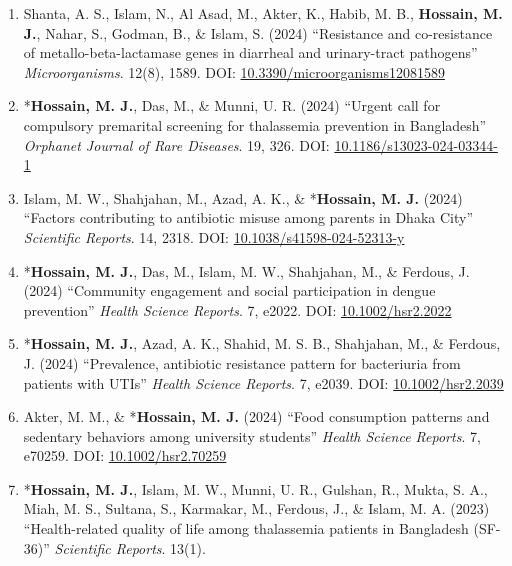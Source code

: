 \documentclass[
  11pt,
  letterpaper,
  DIV=11,
  numbers=noendperiod]{scrartcl}
\begin{document}
\begin{enumerate}
  *\textbf{Hossain, M. J.}, Sony, S. A., Fariha, F. T. J., \& Hossen, S.
  (2025) ``Preventing the silent threat: A perspective on preparing
  Bangladesh for Human Metapneumovirus'' \emph{Health Science Reports}.
  8, e71101. DOI:
  \href{https://doi.org/10.1002/hsr2.71101}{10.1002/hsr2.71101}
\item
  Shanta, A. S., Islam, N., Al Asad, M., Akter, K., Habib, M. B.,
  \textbf{Hossain, M. J.}, Nahar, S., Godman, B., \& Islam, S. (2024)
  ``Resistance and co-resistance of metallo-beta-lactamase genes in
  diarrheal and urinary-tract pathogens'' \emph{Microorganisms}. 12(8),
  1589. DOI:
  \href{https://doi.org/10.3390/microorganisms12081589}{10.3390/microorganisms12081589}
\item
  *\textbf{Hossain, M. J.}, Das, M., \& Munni, U. R. (2024) ``Urgent
  call for compulsory premarital screening for thalassemia prevention in
  Bangladesh'' \emph{Orphanet Journal of Rare Diseases}. 19, 326. DOI:
  \href{https://doi.org/10.1186/s13023-024-03344-1}{10.1186/s13023-024-03344-1}
\item
  Islam, M. W., Shahjahan, M., Azad, A. K., \& *\textbf{Hossain, M. J.}
  (2024) ``Factors contributing to antibiotic misuse among parents in
  Dhaka City'' \emph{Scientific Reports}. 14, 2318. DOI:
  \href{https://doi.org/10.1038/s41598-024-52313-y}{10.1038/s41598-024-52313-y}
\item
  *\textbf{Hossain, M. J.}, Das, M., Islam, M. W., Shahjahan, M., \&
  Ferdous, J. (2024) ``Community engagement and social participation in
  dengue prevention'' \emph{Health Science Reports}. 7, e2022. DOI:
  \href{https://doi.org/10.1002/hsr2.2022}{10.1002/hsr2.2022}
\item
  *\textbf{Hossain, M. J.}, Azad, A. K., Shahid, M. S. B., Shahjahan,
  M., \& Ferdous, J. (2024) ``Prevalence, antibiotic resistance pattern
  for bacteriuria from patients with UTIs'' \emph{Health Science
  Reports}. 7, e2039. DOI:
  \href{https://doi.org/10.1002/hsr2.2039}{10.1002/hsr2.2039}
\item
  Akter, M. M., \& *\textbf{Hossain, M. J.} (2024) ``Food consumption
  patterns and sedentary behaviors among university students''
  \emph{Health Science Reports}. 7, e70259. DOI:
  \href{https://doi.org/10.1002/hsr2.70259}{10.1002/hsr2.70259}
\item
  *\textbf{Hossain, M. J.}, Islam, M. W., Munni, U. R., Gulshan, R.,
  Mukta, S. A., Miah, M. S., Sultana, S., Karmakar, M., Ferdous, J., \&
  Islam, M. A. (2023) ``Health-related quality of life among thalassemia
  patients in Bangladesh (SF-36)'' \emph{Scientific Reports}. 13(1).

\end{enumerate}
\end{document}
